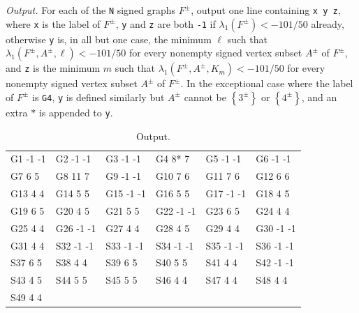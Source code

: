 \documentclass[11pt]{article}
\theoremstyle{definition}
\theoremstyle{remark}
\newcommand{\sset}[1]{\left\{{#1}\right\}}
\newcommand{\la}{\lambda}
\begin{document}
\bigskip
\noindent\textit{Output.} For each of the \texttt{N} signed graphs $F^\pm$, output one line containing \texttt{x y z}, where \texttt{x} is the label of $F^\pm$, \texttt{y} and \texttt{z} are both \texttt{-1} if $\la_1(F^\pm) < -101/50$ already, otherwise \texttt{y} is, in all but one case, the minimum $\ell$ such that $\la_1(F^\pm, A^\pm, \ell) < -101/50$ for every nonempty signed vertex subset $A^\pm$ of $F^\pm$, and \texttt{z} is the minimum $m$ such that $\la_1(F^\pm, A^\pm, K_m) < -101/50$ for every nonempty signed vertex subset $A^\pm$ of $F^\pm$. In the exceptional case where the label of $F^\pm$ is \texttt{G4}, \texttt{y} is defined similarly but $A^\pm$ cannot be $\sset{3^\pm}$ or $\sset{4^\pm}$, and an extra $\texttt{*}$ is appended to \texttt{y}.

\begin{table}[t]
    {\ttfamily
    \begin{tabularx}{\textwidth}{XXXXXX}
        G1 -1 -1& 
        G2 -1 -1&
        G3 -1 -1&
        G4 8* 7&
        G5 -1 -1&
        G6 -1 -1\\
        G7 6 5&
        G8 11 7&
        G9 -1 -1&
        G10 7 6&
        G11 7 6&
        G12 6 6\\
        G13 4 4&
        G14 5 5&
        G15 -1 -1&
        G16 5 5&
        G17 -1 -1&
        G18 4 5\\
        G19 6 5&
        G20 4 5&
        G21 5 5&
        G22 -1 -1&
        G23 6 5&
        G24 4 4\\
        G25 4 4&
        G26 -1 -1&
        G27 4 4&
        G28 4 5&
        G29 4 4&
        G30 -1 -1\\
        G31 4 4&
        S32 -1 -1&
        S33 -1 -1&
        S34 -1 -1&
        S35 -1 -1&
        S36 -1 -1\\
        S37 6 5&
        S38 4 4&
        S39 6 5&
        S40 5 5&
        S41 4 4&
        S42 -1 -1\\
        S43 4 5&
        S44 5 5&
        S45 5 5&
        S46 4 4&
        S47 4 4&
        S48 4 4\\
        S49 4 4
    \end{tabularx}}
    \caption{Output.} \label{table:output}
\end{table}

\bigskip
\end{document}
